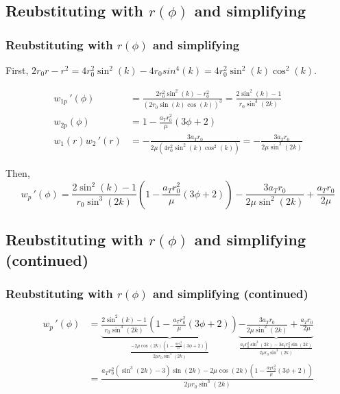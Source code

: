 \documentclass{beamer}
\newcommand{\sectit}[1]{
    \section{\texorpdfstring{#1}{}}
    \frametitle{#1}
}
\begin{document}
\begin{frame}
    \sectit{Reubstituting with $r(\phi)$ and simplifying}

    First, $2r_0r-r^2=4r_0^2\sin^2(k)-4r_0sin^4(k)=4r_0^2\sin^2(k)\cos^2(k)$.

    {\begin{align}
        w_{1p}\,'(\phi)&=\frac{2r_0^2\sin^2(k)-r_0^2}{\left(2r_0\sin(k)\cos(k)\right)^3}=\frac{2\sin^2(k)-1}{r_0\sin^3(2k)}\\
        w_{2p}(\phi)&=1-\frac{a_Tr_0^2}{\mu}(3\phi+2)\\
        w_1(r)w_2\,'(r)&=-\frac{3a_Tr_0}{2\mu(4r_0^2\sin^2(k)\cos^2(k))}=-\frac{3a_Tr_0}{2\mu\sin^2(2k)}
    \end{align}}

    Then, 
    {\footnotesize\begin{equation}
        w_p\,'(\phi)=\frac{2\sin^2(k)-1}{r_0\sin^3(2k)}\left(1-\frac{a_Tr_0^2}{\mu}(3\phi+2)\right)-\frac{3a_Tr_0}{2\mu\sin^2(2k)}+\frac{a_Tr_0}{2\mu}
    \end{equation}}

\end{frame}

\begin{frame}
    \sectit{Reubstituting with $r(\phi)$ and simplifying (continued)}

    {\footnotesize\begin{align}
        w_p\,'(\phi)&=\underbrace{\frac{2\sin^2(k)-1}{r_0\sin^3(2k)}\left(1-\frac{a_Tr_0^2}{\mu}(3\phi+2)\right)}_{\frac{-2\mu\cos(2k)\left(1-\frac{a_Tr_0^2}{\mu}(3\phi+2)\right)}{2\mu r_0\sin^3(2k)}}\underbrace{-\frac{3a_Tr_0}{2\mu\sin^2(2k)}+\frac{a_Tr_0}{2\mu}}_{\frac{a_Tr_0^2\sin^3(2k)-3a_Tr_0^2\sin(2k)}{2\mu r_0\sin^3(2k)}}\\
        &=\frac{a_Tr_0^2\left(\sin^3(2k)-3\right)\sin(2k)-2\mu\cos(2k)\left(1-\frac{a_Tr_0^2}{\mu}(3\phi+2)\right)}{2\mu r_0\sin^3(2k)}
    \end{align}}
\end{frame}
\end{document}
